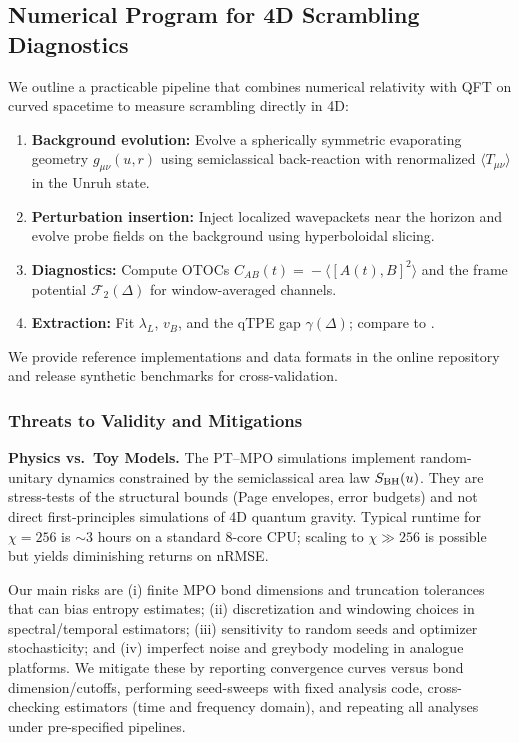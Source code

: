 \documentclass[aps,prd,preprint,onecolumn,superscriptaddress,nofootinbib,longbibliography,floatfix,11pt,showpacs,showkeys]{revtex4-2}
\theoremstyle{plain}
\theoremstyle{definition}
\theoremstyle{remark}
\begin{document}
\subsection{Numerical Program for 4D Scrambling Diagnostics}
\label{sec:scrambling-numerics}
We outline a practicable pipeline that combines numerical relativity with QFT on curved spacetime to measure scrambling directly in 4D:
\begin{enumerate}[leftmargin=*]
\item \textbf{Background evolution:} Evolve a spherically symmetric evaporating geometry $g_{\mu\nu}(u,r)$ using semiclassical back-reaction with renormalized $\langle T_{\mu\nu}\rangle$ in the Unruh state.
\item \textbf{Perturbation insertion:} Inject localized wavepackets near the horizon and evolve probe fields on the background using hyperboloidal slicing.
\item \textbf{Diagnostics:} Compute OTOCs $C_{AB}(t)\!=\!-\langle [A(t),B]^2\rangle$ and the frame potential $\mathcal{F}_2(\Delta)$ for window-averaged channels.
\item \textbf{Extraction:} Fit $\lambda_L$, $v_B$, and the qTPE gap $\gamma(\Delta)$; compare to .
\end{enumerate}
We provide reference implementations and data formats in the online repository and release synthetic benchmarks for cross-validation.

\subsubsection{Threats to Validity and Mitigations}
\textbf{Physics vs.\ Toy Models.} The PT--MPO simulations implement random-unitary dynamics constrained by the semiclassical area law $S_{\rm BH}(u)$. They are stress-tests of the structural bounds (Page envelopes, error budgets) and not direct first-principles simulations of 4D quantum gravity.
Typical runtime for $\chi=256$ is $\sim 3$ hours on a standard 8-core CPU; scaling to $\chi \gg 256$ is possible but yields diminishing returns on nRMSE.

Our main risks are (i) finite MPO bond dimensions and truncation tolerances that can bias entropy estimates; (ii) discretization and windowing choices in spectral/temporal estimators; (iii) sensitivity to random seeds and optimizer stochasticity; and (iv) imperfect noise and greybody modeling in analogue platforms. We mitigate these by reporting convergence curves versus bond dimension/cutoffs, performing seed-sweeps with fixed analysis code, cross-checking estimators (time and frequency domain), and repeating all analyses under pre-specified pipelines.
\end{document}
